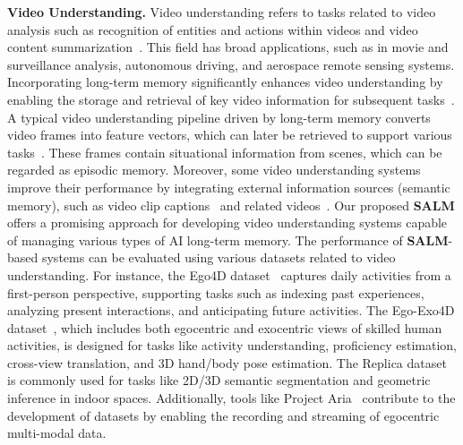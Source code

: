 \documentclass[journal,hideappendix]{vgtc}
\newenvironment{j_itemize}{
\begin{itemize}[]
  \setlength{\itemsep}{3pt}
  \setlength{\parskip}{0pt}
  \setlength{\parsep}{0pt}
}{\end{itemize}}
\begin{document}
\begin{j_itemize}

    \item[$\bullet$] \textbf{Video Understanding.} Video understanding refers to tasks related to video analysis such as recognition of entities and actions within videos and video content summarization~\cite{jiao2021new,wu2021towards,apostolidis2021video,ju2022prompting}. 
    This field has broad applications, such as in movie and surveillance analysis, autonomous driving, and aerospace remote sensing systems. Incorporating long-term memory significantly enhances video understanding by enabling the storage and retrieval of key video information for subsequent tasks~\cite{cheng2022xmem,shen2023encode}.
    A typical video understanding pipeline driven by long-term memory converts video frames into feature vectors, which can later be retrieved to support various tasks~\cite{cheng2022xmem,mezghan2022memory,shen2023encode,song2023moviechat,he2024ma}. These frames contain situational information from scenes, which can be regarded as episodic memory. Moreover, some video understanding systems improve their performance by integrating external information sources (semantic memory), such as video clip captions~\cite{yang2023care} and related videos~\cite{jilan2024egoInstructor}.
    Our proposed \textbf{SALM} offers a promising approach for developing video understanding systems capable of managing various types of AI long-term memory. The performance of \textbf{SALM}-based systems can be evaluated using various datasets related to video understanding. For instance, the Ego4D dataset~\cite{grauman2022ego4d} captures daily activities from a first-person perspective, supporting tasks such as indexing past experiences, analyzing present interactions, and anticipating future activities. The Ego-Exo4D dataset~\cite{grauman2024ego}, which includes both egocentric and exocentric views of skilled human activities, is designed for tasks like activity understanding, proficiency estimation, cross-view translation, and 3D hand/body pose estimation. The Replica dataset~\cite{straub2019replica} is commonly used for tasks like 2D/3D semantic segmentation and geometric inference in indoor spaces. Additionally, tools like Project Aria~\cite{engel2023project} contribute to the development of datasets by enabling the recording and streaming of egocentric multi-modal data.


\end{j_itemize}
\end{document}
